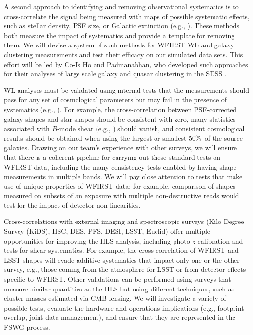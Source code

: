  A second approach to identifying and removing
observational systematics is to cross-correlate the signal being
measured with maps of possible systematic effects, such as stellar
density, PSF size, or Galactic extinction (e.g., \cite{Ross2012}).
These methods both measure the impact of systematics and provide a template for removing
them.  We will devise a system of such methods for WFIRST WL and
galaxy clustering measurements and test their efficacy on our simulated
data sets.  This effort will be led by Co-Is Ho and Padmanabhan, who
developed such approaches for their analyses of large scale galaxy
and quasar clustering in the SDSS \cite{Ho2015,Padmanabhan2007}.

WL analyses must be validated using internal tests that the measurements
should pass for any set of cosmological parameters
but may fail in the presence of systematics (e.g., \cite{Jarvis2015}).
For example, the cross-correlation between
PSF-corrected galaxy shapes and star shapes should be consistent with zero,
many statistics associated with $B$-mode shear (e.g., \cite{Eifler2008}) should vanish,
and consistent cosmological results
should be obtained when using the largest or smallest 50\%\ of the source galaxies.
Drawing on our team's experience with other surveys, we will ensure that
there is a coherent pipeline for carrying out these standard tests on WFIRST
data, including the many consistency tests enabled by having shape
measurements in multiple bands.
We will pay close attention to tests that make use of unique properties of WFIRST data;
for example, comparison of
shapes measured on subsets of an exposure with multiple non-destructive reads would test for
the impact of detector non-linearities.

Cross-correlations with external
imaging and spectroscopic surveys (Kilo Degree Survey (KiDS), HSC, DES, PFS, DESI, LSST, Euclid)
offer multiple opportunities for improving the HLS analysis, including
photo-$z$ calibration and tests for shear systematics.
For example, the cross-correlation of WFIRST and LSST shapes
will evade additive systematics that impact
only one or the other survey, e.g.,
those coming from the atmosphere for LSST or from
detector effects specific to WFIRST.
Other validations can be performed using surveys that measure similar quantities as the
HLS but using different techniques, such as cluster masses estimated  via CMB lensing.
We will investigate a variety of possible tests, evaluate
the hardware and operations implications (e.g., footprint overlap,
joint data management), and ensure that they are represented in the FSWG process.


